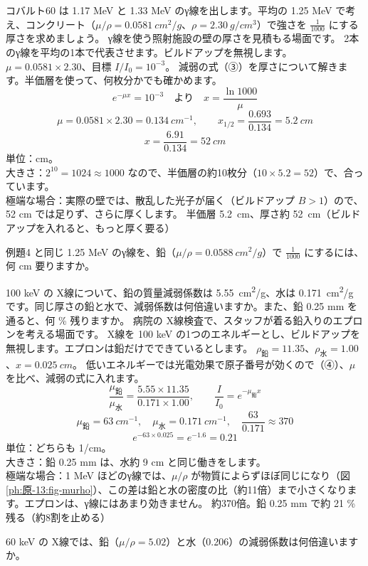 \label{ph:原-13:ex4}
\begin{phreidai}
コバルト60 は 1.17 MeV と 1.33 MeV のγ線を出します。平均の 1.25 MeV で考え、コンクリート（$\mu/\rho=\qty{0.0581}{cm^2/g}$、$\rho=\qty{2.30}{g/cm^3}$）で強さを $\tfrac1{1000}$ にする厚さを求めましょう。
\phbamen
γ線を使う照射施設の壁の厚さを見積もる場面です。
\phmushi
2本のγ線を平均の1本で代表させます。ビルドアップを無視します。
\phzu
$\mu=0.0581\times2.30$、目標 $I/I_0=10^{-3}$。
\phriyu
減弱の式（③）を厚さについて解きます。半価層を使って、何枚分かでも確かめます。
\phtateru
\[ e^{-\mu x}=10^{-3}\quad\text{より}\quad x=\frac{\ln1000}{\mu} \]
\phtoku
\[ \mu=0.0581\times2.30=\qty{0.134}{cm^{-1}},\qquad x_{1/2}=\frac{0.693}{0.134}=\qty{5.2}{cm} \]
\[ x=\frac{6.91}{0.134}=\qty{52}{cm} \]
\phtashikame
単位：cm。\\
大きさ：$2^{10}=1024\approx1000$ なので、半価層の約10枚分（$10\times5.2=52$）で、合っています。\\
極端な場合：実際の壁では、散乱した光子が届く（ビルドアップ $B>1$）ので、52 cm では足りず、さらに厚くします。
\kotae 半価層 \qty{5.2}{cm}、厚さ約 \qty{52}{cm}（ビルドアップを入れると、もっと厚く要る）
\end{phreidai}
\begin{jibun}
例題4 と同じ 1.25 MeV のγ線を、鉛（$\mu/\rho=\qty{0.0588}{cm^2/g}$）で $\tfrac1{1000}$ にするには、何 cm 要りますか。
\end{jibun}

\label{ph:原-13:ex5}
\begin{phreidai}
100 keV の X線について、鉛の質量減弱係数は \qty{5.55}{cm^2/g}、水は \qty{0.171}{cm^2/g} です。同じ厚さの鉛と水で、減弱係数は何倍違いますか。また、鉛 0.25 mm を通ると、何 \% 残りますか。
\phbamen
病院の X線検査で、スタッフが着る鉛入りのエプロンを考える場面です。
\phmushi
X線を 100 keV の1つのエネルギーとし、ビルドアップを無視します。エプロンは鉛だけでできているとします。
\phzu
$\rho_{\text{鉛}}=11.35$、$\rho_{\text{水}}=1.00$、$x=\qty{0.025}{cm}$。
\phriyu
低いエネルギーでは光電効果で原子番号が効くので（④）、$\mu$ を比べ、減弱の式に入れます。
\phtateru
\[ \frac{\mu_{\text{鉛}}}{\mu_{\text{水}}}=\frac{5.55\times11.35}{0.171\times1.00},\qquad \frac{I}{I_0}=e^{-\mu_{\text{鉛}}x} \]
\phtoku
\[ \mu_{\text{鉛}}=\qty{63}{cm^{-1}},\quad \mu_{\text{水}}=\qty{0.171}{cm^{-1}},\quad \frac{63}{0.171}\approx370 \]
\[ e^{-63\times0.025}=e^{-1.6}=0.21 \]
\phtashikame
単位：どちらも 1/cm。\\
大きさ：鉛 0.25 mm は、水約 9 cm と同じ働きをします。\\
極端な場合：1 MeV ほどのγ線では、$\mu/\rho$ が物質によらずほぼ同じになり（図\ref{ph:原-13:fig-murho}）、この差は鉛と水の密度の比（約11倍）まで小さくなります。エプロンは、γ線にはあまり効きません。
\kotae 約370倍。鉛 0.25 mm で約 21 \% 残る（約8割を止める）
\end{phreidai}
\begin{jibun}
60 keV の X線では、鉛（$\mu/\rho=5.02$）と水（0.206）の減弱係数は何倍違いますか。
\end{jibun}

